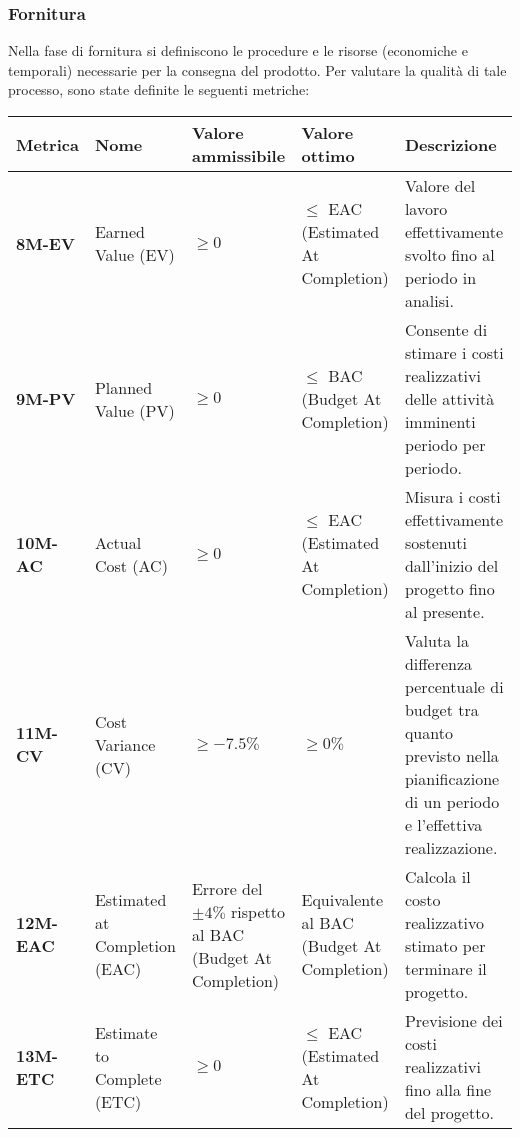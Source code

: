 \subsubsection{Fornitura}
Nella fase di fornitura si definiscono le procedure e le risorse (economiche e temporali) necessarie per la consegna del prodotto.
Per valutare la qualità di tale processo, sono state definite le seguenti metriche:
\begin{longtable}{|>{\centering\arraybackslash}p{}|>{\centering\arraybackslash}p{}|>{\centering\arraybackslash}p{}|>{\centering\arraybackslash}p{}|>{\centering\arraybackslash}p{}|}
	\hline
	\textbf{Metrica}  & \textbf{Nome}                & \textbf{Valore ammissibile} & \textbf{Valore ottimo} & \textbf{Descrizione}\\
	\hline
	\endhead
	\textbf{8M-EV}   & Earned Value (EV)             & $\geq 0$                                                    & $\leq$ EAC (Estimated At Completion)      & Valore del lavoro effettivamente svolto fino al periodo in analisi.                                                            \\
	\hline
	\textbf{9M-PV}   & Planned Value (PV)            & $\geq 0$                                                    & $\leq$ BAC (Budget At Completion)         & Consente di stimare i costi realizzativi delle attività imminenti periodo per periodo.                                         \\
	\hline
	\textbf{10M-AC}  & Actual Cost (AC)              & $\geq 0$                                                    & $\leq$ EAC (Estimated At Completion)      & Misura i costi effettivamente sostenuti dall'inizio del progetto fino al presente.                                             \\
	\hline
	\textbf{11M-CV}  & Cost Variance (CV)            & $\geq -7.5\%$                                               & $\geq 0\%$                                & Valuta la differenza percentuale di budget tra quanto previsto nella pianificazione di un periodo e l'effettiva realizzazione. \\
	\hline
	\textbf{12M-EAC} & Estimated at Completion (EAC) & Errore del $\pm 4\%$ rispetto al BAC (Budget At Completion) & Equivalente al BAC (Budget At Completion) & Calcola il costo realizzativo stimato per terminare il progetto.                                                               \\
	\hline
	\textbf{13M-ETC} & Estimate to Complete (ETC)    & $\geq 0$                                                    & $\leq$ EAC (Estimated At Completion)      & Previsione dei costi realizzativi fino alla fine del progetto.                                                                 \\

\end{longtable}
